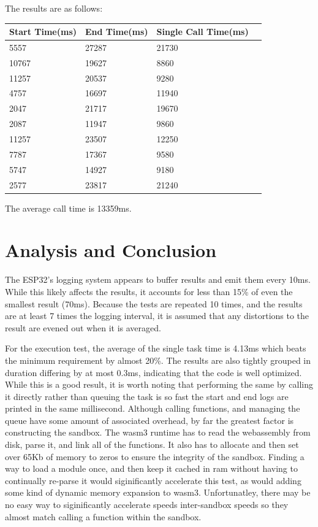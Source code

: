 \documentclass{article}
\begin{document}
\begin{enumerate}
The results are as follows:
\begin{table}[H]
\begin{tabular}{|l|l|l|l|}
\hline
Start Time(ms)		&End Time(ms)				&Single Call Time(ms)\\ \hline
5557	 & 27287	 & 21730\\ \hline
10767	 & 19627	 & 8860\\ \hline
11257	 & 20537	 & 9280\\ \hline
4757	 & 16697	 & 11940\\ \hline
2047	 & 21717	 & 19670\\ \hline
2087	 & 11947	 & 9860\\ \hline
11257	 & 23507	 & 12250\\ \hline
7787	 & 17367	 & 9580\\ \hline
5747	 & 14927	 & 9180\\ \hline
2577	 & 23817	 & 21240\\ \hline
\end{tabular}
\end{table}

The average call time is 13359ms.

\end{enumerate}


\section{Analysis and Conclusion}
The ESP32's logging system appears to buffer results and emit them every 10ms. While this likely affects the results, it accounts for less than 15\% of even the smallest result (70ms). Because the tests are repeated 10 times, and the results are at least 7 times the logging interval, it is assumed that any distortions to the result are evened out when it is averaged.

For the execution test, the average of the single task time is 4.13ms which beats the minimum requirement by almost 20\%. The results are also tightly grouped in duration differing by at most 0.3ms, indicating that the code is well optimized. While this is a good result, it is worth noting that performing the same by calling it directly rather than queuing the task is so fast the start and end logs are printed in the same millisecond. Although calling functions, and managing the queue have some amount of associated overhead, by far the greatest factor is constructing the sandbox. The wasm3 runtime has to read the webassembly from disk, parse it, and link all of the functions. It also has to allocate and then set over 65Kb of memory to zeros to ensure the integrity of the sandbox. Finding a way to load a module once, and then keep it cached in ram without having to continually re-parse it would siginificantly accelerate this test, as would adding some kind of dynamic memory expansion to wasm3. Unfortunatley, there may be no easy way to siginificantly accelerate speeds inter-sandbox speeds so they almost match calling a function within the sandbox.
\end{document}
